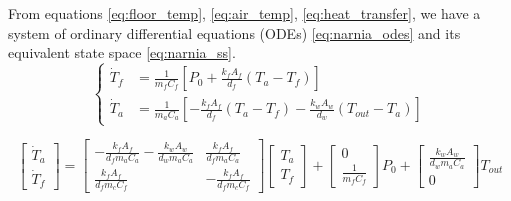 \documentclass[../main.tex]{subfiles}
\begin{document}
From equations \ref{eq:floor_temp}, \ref{eq:air_temp}, \ref{eq:heat_transfer}, we have a system of ordinary differential equations (ODEs) \ref{eq:narnia_odes} and its equivalent state space \ref{eq:narnia_ss}.
\begin{equation}
    \left\{
    \begin{aligned}
        \dot{T}_f &= \frac{1}{m_f C_f}\left[P_0 +\frac{k_f A_f}{d_f}(T_a - T_f)\right] \\
        \dot{T}_a &= \frac{1}{m_a C_a}\left[-\frac{k_f A_f}{d_f}(T_a - T_f) - \frac{k_w A_w}{d_w}(T_{out} - T_a)\right]
    \end{aligned}
    \right.
    \label{eq:narnia_odes}
\end{equation}

\begin{equation}
    \begin{bmatrix}
      \dot{T}_a \\
      \dot{T}_f 
    \end{bmatrix} = \begin{bmatrix}
      -\frac{k_f A_f}{d_f m_a C_a} - \frac{k_w A_w}{d_w m_a C_a} & \frac{k_f A_f}{d_f m_a C_a} \\
      \frac{k_f A_f}{d_f m_c C_f} & -\frac{k_f A_f}{d_f m_c C_f}
    \end{bmatrix} \begin{bmatrix}
      T_a \\
      T_f
    \end{bmatrix} + \begin{bmatrix}
      0 \\
      \frac{1}{m_f C_f}
    \end{bmatrix}P_0 + \begin{bmatrix}
      \frac{k_w A_w}{d_w m_a C_a} \\
      0
    \end{bmatrix}T_{out}
    \label{eq:narnia_ss}
\end{equation}
\end{document}
